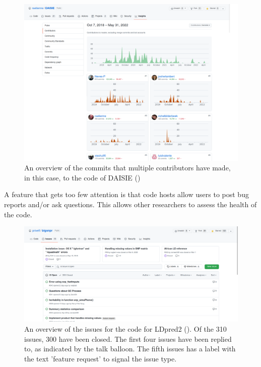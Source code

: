 \begin{figure}[!htbp]
  \centering
  \includegraphics[width=\linewidth]{daisie_contributors.png}
  \caption{
    An overview of the commits that multiple contributors have
    made, in this case, to the code of DAISIE (\cite{etienne2020daisie})
  }
  \label{fig:daisie_contributors}
\end{figure}



A feature that gets too few attention is that code hosts
allow users to post bug reports and/or ask questions.
This allows other researchers to assess the health
of the code.

\begin{figure}[!htbp]
  \centering
  \includegraphics[width=\linewidth]{issue_ldpred2.png}
  \caption{
    An overview of the issues for the code for
    LDpred2 (\cite{prive2020ldpred2}). Of the 310 issues, 300 have been closed.
    The first four issues have been replied to, as indicated by the
    talk balloon. The fifth issues has a label with the text 'feature request'
    to signal the issue type.
  }
  \label{fig:issue_ldpred2}
\end{figure}


